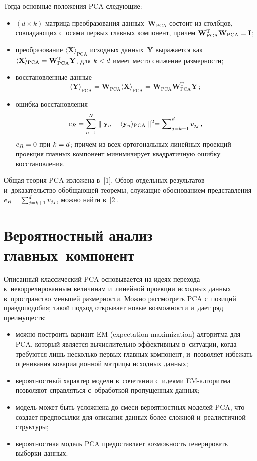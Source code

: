 \begin{multicols}{2}
     Тогда основные положения PCA следующие:
     \begin{itemize}
\item $(d\times k)$-мат\-ри\-ца преобразования данных~$\mathbf{W}_{\mathrm{PCA}}$ 
состоит из столбцов, совпадающих с~осями первых главных компонент, причем 
$\mathbf{W}^{\mathrm{T}}_{\mathrm{PCA}} \mathbf{W}_{\mathrm{PCA}}\hm=\mathbf{I}$;
\item преобразование $\langle \mathbf{X}\rangle_{\mathrm{PCA}}$ исходных 
данных~$\mathbf{Y}$ выражается как $\langle \mathbf{X}\rangle_{\mathrm{PCA}}\hm= 
\mathbf{W}^{\mathrm{T}}_{\mathrm{PCA}} \mathbf{Y}$, для $k\hm<d$ имеет место 
снижение размерности;
\item восстановленные данные 
$$
\langle \mathbf{Y}\rangle_{\mathrm{PCA}}= 
\mathbf{W}_{\mathrm{PCA}}\langle \mathbf{X}\rangle_{\mathrm{PCA}} = 
\mathbf{W}_{\mathrm{PCA}}\mathbf{W}^{\mathrm{T}}_{\mathrm{PCA}} \mathbf{Y}\,;
$$
\item ошибка восстановления 
$$
e_R= \sum\limits^N_{n=1}\parallel 
\mathbf{y}_n\hm- \langle \mathbf{y}_n\rangle_{\mathrm{PCA}}\parallel^2\hm= 
\sum\nolimits^d_{j=k+1} v_{jj}\,,
$$
 $e_R\hm=0$ при $k\hm=d$; причем из всех 
ортогональных линейных проекций проекция главных компонент 
минимизирует квадратичную ошибку восстановления. 
\end{itemize}

     Общая теория PCA изложена в~[1]. Обзор отдельных результатов 
и~доказательство обобщающей теоремы, служащие обоснованием 
представления $e_R\hm= \sum\nolimits^d_{j=k+1} v_{jj}$, можно найти в~[2].
     
\section{Вероятностный анализ главных~компонент}

     Описанный классический PCA основывается на идеях перехода 
к~некоррелированным величинам и~линейной проекции исходных данных 
в~пространство меньшей размерности. Можно рас\-смот\-реть PCA с~позиций 
правдоподобия; такой подход открывает новые возможности и~дает ряд 
преимуществ:
     \begin{itemize}
\item можно построить вариант EM (expectation-maximization) ал\-го\-рит\-ма для PCA, который является 
вычислительно эффективным в~ситуации, когда тре\-бу\-ют\-ся лишь несколько 
первых главных компонент, и~позволяет избежать оценивания ковариационной 
мат\-ри\-цы исходных данных;
\item вероятностный характер модели в~сочетании с~идеями EM-ал\-го\-рит\-ма 
позволяют справляться с~обработкой пропущенных данных;
\item модель может быть усложнена до смеси вероятностных моделей PCA, что 
создает предпосылки для описания данных более сложной и~реалистичной 
структуры;
\item вероятностная модель PCA предоставляет возможность генерировать 
выборки данных.
\end{itemize}


\end{multicols}
